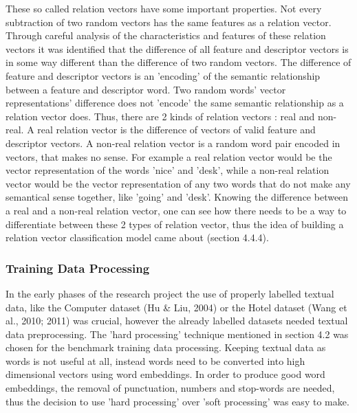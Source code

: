 \documentclass{sig-alternate}
\begin{document}
These so called relation vectors have some important properties. Not every subtraction of two random vectors has the same features as a relation vector. Through careful analysis of the characteristics and features of these relation vectors it was identified that the difference of all feature and descriptor vectors is in some way different than the difference of two random vectors. The difference of feature and descriptor vectors is an 'encoding' of the semantic relationship between a feature and descriptor word. Two random words' vector  representations' difference does not 'encode' the same semantic relationship as a relation vector does. Thus, there are 2 kinds of relation vectors : real and non-real. A real relation vector is the difference of vectors of valid feature and descriptor vectors. A non-real relation vector is a random word pair encoded in vectors, that makes no sense. For example a real relation vector would be the vector representation of the words 'nice' and 'desk', while a non-real relation vector would be the vector representation of any two words that do not make any semantical sense together, like 'going' and 'desk'. Knowing the difference between a real and a non-real relation vector, one can see how there needs to be a way to differentiate between these 2 types of relation vector, thus the idea of building a relation vector classification model came about (section 4.4.4).

\subsubsection{Training Data Processing}
In the early phases of the research project the use of properly labelled textual data, like the Computer dataset (Hu \& Liu, 2004) or the Hotel dataset (Wang et al., 2010; 2011) was crucial, however the already labelled datasets needed textual data preprocessing. The 'hard processing' technique mentioned in section 4.2 was chosen for the benchmark training data processing. Keeping textual data as words is not useful at all, instead words need to be converted into high dimensional vectors using word embeddings. In order to produce good word embeddings, the removal of punctuation, numbers and stop-words are needed, thus the decision to use 'hard processing' over 'soft processing' was easy to make.
\end{document}
